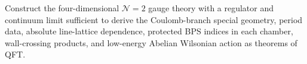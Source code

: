 \begin{openproblem}
\label{op:theorem-level-seiberg-witten-construction}
Construct the four-dimensional \(\mathcal N=2\) gauge theory with a regulator
and continuum limit sufficient to derive the Coulomb-branch special geometry,
period data, absolute line-lattice dependence, protected BPS indices in each
chamber, wall-crossing products, and low-energy Abelian Wilsonian action as
theorems of QFT.
\end{openproblem}
